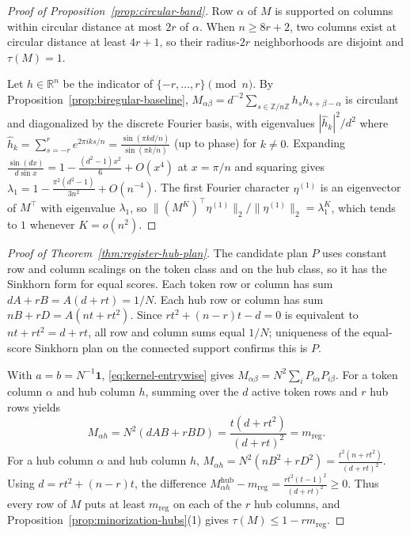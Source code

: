 \documentclass[10pt]{article}
\newcommand{\one}{\mathbf{1}}
\begin{document}
\begin{proof}[Proof of Proposition~\ref{prop:circular-band}]
Row $\alpha$ of $M$ is supported on columns within circular distance at most $2r$ of $\alpha$. When $n \ge 8r + 2$, two columns exist at circular distance at least $4r + 1$, so their radius-$2r$ neighborhoods are disjoint and $\tau(M) = 1$.

Let $h \in \mathbb{R}^n$ be the indicator of $\{-r, \dots, r\} \pmod n$. By Proposition~\ref{prop:biregular-baseline}, $M_{\alpha\beta} = d^{-2}\sum_{s \in \mathbb{Z}/n\mathbb{Z}} h_s h_{s+\beta-\alpha}$ is circulant and diagonalized by the discrete Fourier basis, with eigenvalues $|\widehat h_k|^2 / d^2$ where $\widehat h_k = \sum_{s=-r}^r e^{2\pi i k s / n} = \frac{\sin(\pi k d / n)}{\sin(\pi k / n)}$ (up to phase) for $k \neq 0$. Expanding $\frac{\sin(dx)}{d\sin x} = 1 - \frac{(d^2-1)x^2}{6} + O(x^4)$ at $x = \pi/n$ and squaring gives $\lambda_1 = 1 - \frac{\pi^2(d^2-1)}{3n^2} + O(n^{-4})$. The first Fourier character $\eta^{(1)}$ is an eigenvector of $M^\top$ with eigenvalue $\lambda_1$, so $\|(M^K)^\top \eta^{(1)}\|_2 / \|\eta^{(1)}\|_2 = \lambda_1^K$, which tends to $1$ whenever $K = o(n^2)$.
\end{proof}

\begin{proof}[Proof of Theorem~\ref{thm:register-hub-plan}]
The candidate plan $P$ uses constant row and column scalings on the token class and on the hub class, so it has the Sinkhorn form for equal scores. Each token row or column has sum $dA + rB = A(d+rt) = 1/N$. Each hub row or column has sum $nB + rD = A(nt + rt^2)$. Since $rt^2 + (n-r)t - d = 0$ is equivalent to $nt + rt^2 = d + rt$, all row and column sums equal $1/N$; uniqueness of the equal-score Sinkhorn plan on the connected support confirms this is $P$.

With $a = b = N^{-1}\one$, \eqref{eq:kernel-entrywise} gives $M_{\alpha\beta} = N^2 \sum_i P_{i\alpha} P_{i\beta}$. For a token column $\alpha$ and hub column $h$, summing over the $d$ active token rows and $r$ hub rows yields
\[
  M_{\alpha h} = N^2(dAB + rBD) = \frac{t(d + r t^2)}{(d + rt)^2} = m_{\mathrm{reg}}.
\]
For a hub column $\alpha$ and hub column $h$, $M_{\alpha h} = N^2(nB^2 + rD^2) = \frac{t^2(n + r t^2)}{(d + rt)^2}$. Using $d = rt^2 + (n-r)t$, the difference $M_{\alpha h}^{\mathrm{hub}} - m_{\mathrm{reg}} = \frac{r t^2(t-1)^2}{(d+rt)^2} \ge 0$. Thus every row of $M$ puts at least $m_{\mathrm{reg}}$ on each of the $r$ hub columns, and Proposition~\ref{prop:minorization-hubs}(1) gives $\tau(M) \le 1 - r m_{\mathrm{reg}}$.
\end{proof}
\end{document}
